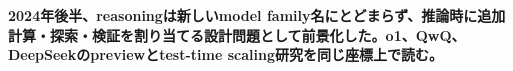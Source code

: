 \noindent\textbf{2024年後半、reasoningは新しいmodel family名にとどまらず、推論時に追加計算・探索・検証を割り当てる設計問題として前景化した。o1、QwQ、DeepSeekのpreviewとtest-time scaling研究を同じ座標上で読む。}\autocite{src-14a855188533,src-a452b2dc7f5d}

